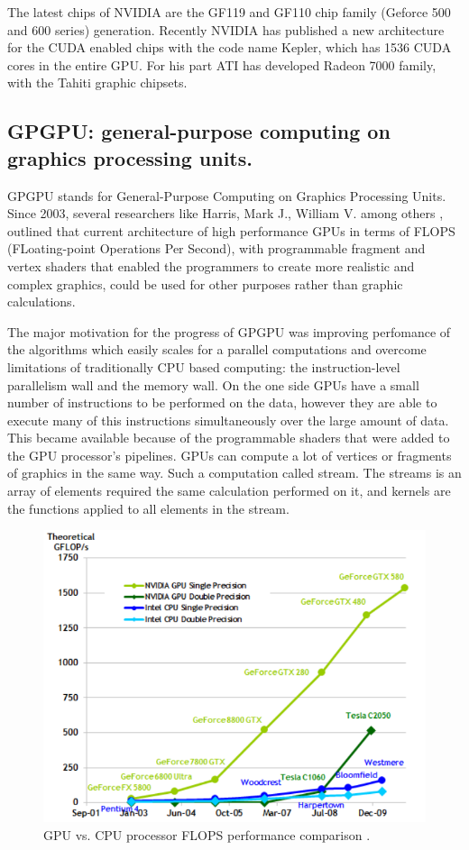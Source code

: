 \documentclass[thesis=M,english]{FITthesis}[2011/07/15]
\begin{document}
The latest chips of NVIDIA are the GF119 and GF110 chip family (Geforce 500 and 600 series) generation. Recently NVIDIA has published a new architecture for the CUDA enabled chips with the code name Kepler, which has 1536 CUDA cores in the entire GPU. For his part ATI has developed Radeon 7000 family, with the Tahiti graphic chipsets.

\subsection{GPGPU: general-purpose computing on graphics processing units.}
GPGPU stands for General-Purpose Computing on Graphics Processing Units. Since 2003, several researchers like Harris, Mark J., William V. among others \cite{gpgpu}, outlined that current architecture of high performance GPUs in terms of FLOPS (FLoating-point Operations Per Second), with programmable fragment and vertex shaders that enabled the programmers to create more realistic and complex graphics, could be used for other purposes rather than graphic calculations.

The major motivation for the progress of GPGPU was improving perfomance of the algorithms which easily scales for a parallel computations and overcome limitations of traditionally CPU based computing: the instruction-level parallelism wall and the memory wall. On the one side GPUs have a small number of instructions to be performed on the data, however they are able to execute many of this instructions simultaneously over the large amount of data. This became available because of the programmable shaders that were added to the GPU processor's pipelines. GPUs can compute a lot of vertices or fragments of graphics in the same way. Such a computation called stream. The streams is an array of elements required the same calculation performed on it, and kernels are the functions applied to all elements in the stream.

\begin{figure}[h]
\centering
\includegraphics[scale=0.45]{images/cpuvsgpu.png}
\caption{GPU vs. CPU processor FLOPS performance comparison \cite{cuda_guide}.}
\label{fig:cpuvsgpu}
\end{figure}
\end{document}
